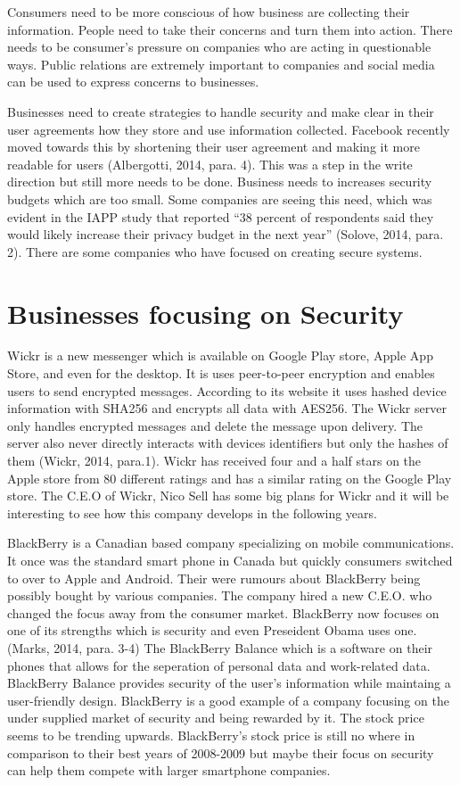 \documentclass[12pt]{article}
\begin{document}
Consumers need to be more conscious of how business are collecting their information. People need to take their concerns and turn them into action. There needs to be consumer's pressure on companies who are acting in questionable ways. Public relations are extremely important to companies and social media can be used to express concerns to businesses. 

Businesses need to create strategies to handle security and make clear in their user agreements how they store and use information collected. Facebook recently moved towards this by shortening their user agreement and making it more readable for users (Albergotti, 2014, para. 4). This was a step in the write direction but still more needs to be done. Business needs to increases security budgets which are too small. Some companies are seeing this need, which was evident in the IAPP study that reported ``38 percent of respondents said they would likely increase their privacy budget in the next year'' (Solove, 2014, para. 2). There are some companies who have focused on creating secure systems.

\section{Businesses focusing on Security}\label{sec:real-life}
Wickr is a new messenger which is available on Google Play store, Apple App Store, and even for the desktop. It is uses peer-to-peer encryption and enables users to send encrypted messages.  According to its website it uses hashed device information with SHA256 and encrypts all data with AES256. The Wickr server only handles encrypted messages and delete the message upon delivery. The server also never directly interacts with devices identifiers but only the hashes of them (Wickr, 2014, para.1). Wickr has received four and a half stars on the Apple store from 80 different ratings and has a similar rating on the Google Play store. The C.E.O of Wickr, Nico Sell has some big plans for Wickr and it will be interesting to see how this company develops in the following years.

BlackBerry is a Canadian based company specializing on mobile communications. It once was the standard smart phone in Canada but quickly consumers switched to over to Apple and Android. Their were rumours about BlackBerry being possibly bought by various companies. The company hired a new C.E.O. who changed the focus away from the consumer market. BlackBerry now focuses on one of its strengths which is security and even Preseident Obama uses one.(Marks, 2014, para. 3-4) The BlackBerry Balance which is a software on their phones that allows for the seperation of personal data and work-related data. BlackBerry Balance provides security of the user's information while maintaing a user-friendly design. BlackBerry is a good example of a company focusing on the under supplied market of security and being rewarded by it. The stock price seems to be trending upwards. BlackBerry's stock price is still no where in comparison to their best years of 2008-2009 but maybe their focus on security can help them compete with larger smartphone companies.
\end{document}
